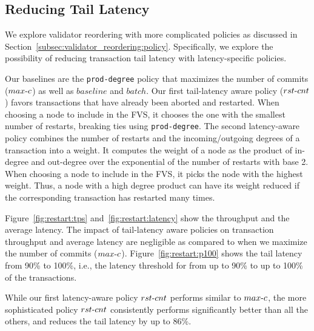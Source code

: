 \subsection{Reducing Tail Latency}

We explore validator reordering with more complicated policies as discussed in Section~\ref{subsec:validator_reordering:policy}. Specifically, we explore the possibility of reducing transaction tail latency with latency-specific policies.

Our baselines are the \texttt{prod-degree} policy that maximizes the number of commits ($max\hbox{-}c$) as well as $baseline$ and $batch$. 
Our first tail-latency aware policy ($rst\hbox{-}cnt$) favors transactions that have already been aborted and restarted. When choosing a node to include in the FVS, it chooses the one with the smallest number of restarts, breaking ties using \texttt{prod-degree}.
The second latency-aware policy combines the number of restarts and the incoming/outgoing degrees of a transaction into a weight. It computes the weight of a node as
the product of in-degree and out-degree over the exponential of the number of
restarts with base 2. When choosing a node to include in the FVS, it picks the node with the highest weight. Thus, a node with a high degree product can have its weight reduced if the corresponding transaction has restarted many times.

Figure~\ref{fig:restart:tps} and~\ref{fig:restart:latency} show the throughput
and the average latency. The impact of tail-latency aware policies on transaction throughput and average latency are negligible as compared to when we maximize the number of commits ($max\hbox{-}c$).
Figure~\ref{fig:restart:p100} shows the tail latency from 90\% to 100\%, i.e., the latency threshold for from up to 90\% to up to 100\% of the transactions. %

While our first latency-aware policy $rst\hbox{-}cnt$ performs similar to $max\hbox{-}c$, the more sophisticated policy $rst\hbox{-}cnt$ consistently performs significantly better than all the others, and reduces the tail latency by up to 86\%.%

